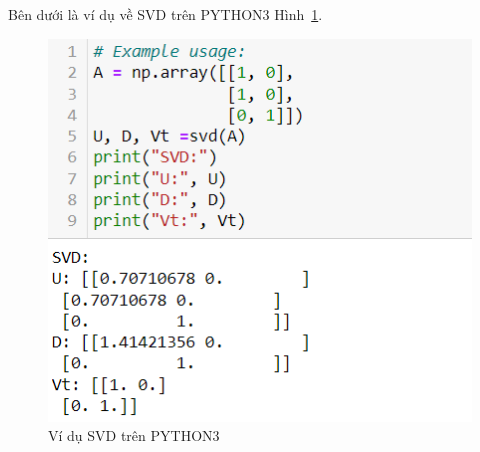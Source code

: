 \documentclass[12pt,a4paper,oneside]{report}
\numberwithin{equation}{section}
\begin{document}
Bên dưới là ví dụ về SVD trên PYTHON3 Hình~\ref{fig:SVD_example}.
\newpage
\begin{figure}[htp]
	\centering
	\includegraphics[scale=0.9]{example_svd.png}
	\caption{Ví dụ SVD trên PYTHON3}
	\label{fig:SVD_example}
\end{figure}
%
%
\end{document}
